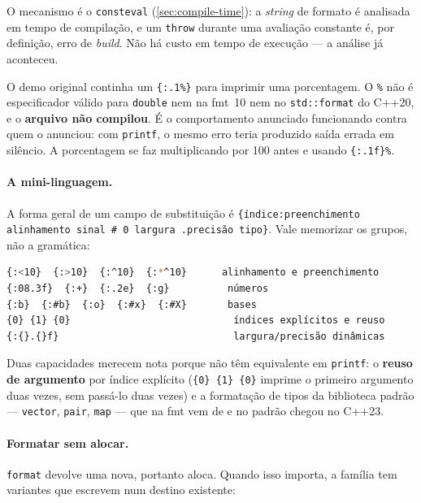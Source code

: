 O mecanismo é o \texttt{consteval} (\cref{sec:compile-time}): a \emph{string} de
formato é analisada em tempo de compilação, e um \texttt{throw} durante uma
avaliação constante é, por definição, erro de \emph{build}. Não há custo em
tempo de execução --- a análise já aconteceu.

\begin{armadilha}
O demo original continha um \texttt{\{:.1\%\}} para imprimir uma porcentagem.
O \texttt{\%} não é especificador válido para \texttt{double} nem na fmt~10 nem
no \texttt{std::format} do C++20, e o \textbf{arquivo não compilou}. É o
comportamento anunciado funcionando contra quem o anunciou: com
\texttt{printf}, o mesmo erro teria produzido saída errada em silêncio. A
porcentagem se faz multiplicando por 100 antes e usando \texttt{\{:.1f\}\%}.
\end{armadilha}

\paragraph{A mini-linguagem.} A forma geral de um campo de substituição é
\texttt{\{índice:preenchimento alinhamento sinal \# 0 largura .precisão tipo\}}.
Vale memorizar os grupos, não a gramática:

\begin{lstlisting}[style=bt, language=bash,
    caption={Saída de \texttt{src/strings/}: os grupos da especificação.}]
{:<10}  {:>10}  {:^10}  {:*^10}      alinhamento e preenchimento
{:08.3f}  {:+}  {:.2e}  {:g}          números
{:b}  {:#b}  {:o}  {:#x}  {:#X}       bases
{0} {1} {0}                            índices explícitos e reuso
{:{}.{}f}                              largura/precisão dinâmicas
\end{lstlisting}

Duas capacidades merecem nota porque não têm equivalente em \texttt{printf}: o
\textbf{reuso de argumento} por índice explícito (\texttt{\{0\} \{1\} \{0\}}
imprime o primeiro argumento duas vezes, sem passá-lo duas vezes) e a
formatação de tipos da biblioteca padrão --- \texttt{vector}, \texttt{pair},
\texttt{map} --- que na fmt vem de  e no padrão chegou
no C++23.

\paragraph{Formatar sem alocar.} \texttt{format} devolve uma
 nova, portanto aloca. Quando isso importa, a família tem
variantes que escrevem num destino existente:

